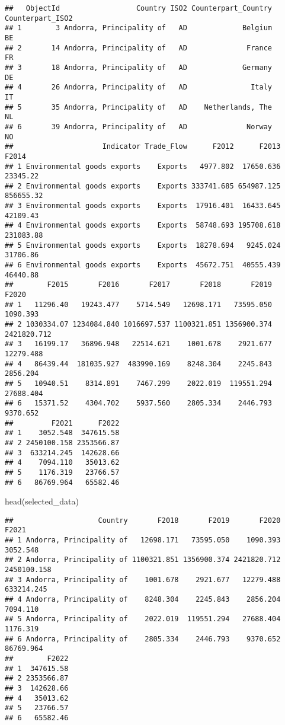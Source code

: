 \documentclass[
]{article}
\newenvironment{Shaded}{\begin{snugshade}}{\end{snugshade}}
\newcommand{\FunctionTok}[1]{\textcolor[rgb]{0.00,0.00,0.00}{#1}}
\newcommand{\NormalTok}[1]{#1}
\begin{document}
\begin{verbatim}
##   ObjectId                  Country ISO2 Counterpart_Country Counterpart_ISO2
## 1        3 Andorra, Principality of   AD             Belgium               BE
## 2       14 Andorra, Principality of   AD              France               FR
## 3       18 Andorra, Principality of   AD             Germany               DE
## 4       26 Andorra, Principality of   AD               Italy               IT
## 5       35 Andorra, Principality of   AD    Netherlands, The               NL
## 6       39 Andorra, Principality of   AD              Norway               NO
##                     Indicator Trade_Flow      F2012      F2013     F2014
## 1 Environmental goods exports    Exports   4977.802  17650.636  23345.22
## 2 Environmental goods exports    Exports 333741.685 654987.125 856655.32
## 3 Environmental goods exports    Exports  17916.401  16433.645  42109.43
## 4 Environmental goods exports    Exports  58748.693 195708.618 231083.88
## 5 Environmental goods exports    Exports  18278.694   9245.024  31706.86
## 6 Environmental goods exports    Exports  45672.751  40555.439  46440.88
##        F2015       F2016       F2017       F2018       F2019       F2020
## 1   11296.40   19243.477    5714.549   12698.171   73595.050    1090.393
## 2 1030334.07 1234084.840 1016697.537 1100321.851 1356900.374 2421820.712
## 3   16199.17   36896.948   22514.621    1001.678    2921.677   12279.488
## 4   86439.44  181035.927  483990.169    8248.304    2245.843    2856.204
## 5   10940.51    8314.891    7467.299    2022.019  119551.294   27688.404
## 6   15371.52    4304.702    5937.560    2805.334    2446.793    9370.652
##         F2021      F2022
## 1    3052.548  347615.58
## 2 2450100.158 2353566.87
## 3  633214.245  142628.66
## 4    7094.110   35013.62
## 5    1176.319   23766.57
## 6   86769.964   65582.46
\end{verbatim}

\begin{Shaded}
\begin{Highlighting}[]
\FunctionTok{head}\NormalTok{(selected\_data)}
\end{Highlighting}
\end{Shaded}

\begin{verbatim}
##                    Country       F2018       F2019       F2020       F2021
## 1 Andorra, Principality of   12698.171   73595.050    1090.393    3052.548
## 2 Andorra, Principality of 1100321.851 1356900.374 2421820.712 2450100.158
## 3 Andorra, Principality of    1001.678    2921.677   12279.488  633214.245
## 4 Andorra, Principality of    8248.304    2245.843    2856.204    7094.110
## 5 Andorra, Principality of    2022.019  119551.294   27688.404    1176.319
## 6 Andorra, Principality of    2805.334    2446.793    9370.652   86769.964
##        F2022
## 1  347615.58
## 2 2353566.87
## 3  142628.66
## 4   35013.62
## 5   23766.57
## 6   65582.46
\end{verbatim}
\end{document}
